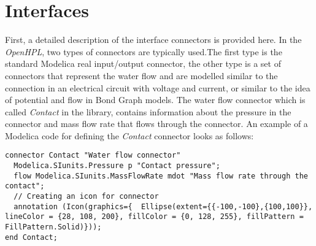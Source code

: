 \documentclass[%
]{USN-PhD}
\begin{document}
\section{Interfaces}

First, a detailed description of the interface connectors is provided here. In the \emph{OpenHPL}, two types of connectors are typically used.The first type is the standard Modelica real input/output connector, the other type is a set of connectors that represent the water flow and are modelled similar to the connection in an electrical circuit with voltage and current, or similar to the idea of potential and flow in Bond Graph models. The water flow connector which is called \emph{Contact} in the library, contains information about the pressure in the connector and mass flow rate that flows through the connector. An example of a Modelica code for defining the \emph{Contact} connector looks as follows:

\begin{lstlisting}[language = modelica]
connector Contact "Water flow connector"
  Modelica.SIunits.Pressure p "Contact pressure";
  flow Modelica.SIunits.MassFlowRate mdot "Mass flow rate through the contact";
  // Creating an icon for connector
  annotation (Icon(graphics={  Ellipse(extent={{-100,-100},{100,100}}, lineColor = {28, 108, 200}, fillColor = {0, 128, 255}, fillPattern = FillPattern.Solid)}));
end Contact;
\end{lstlisting}
\end{document}
